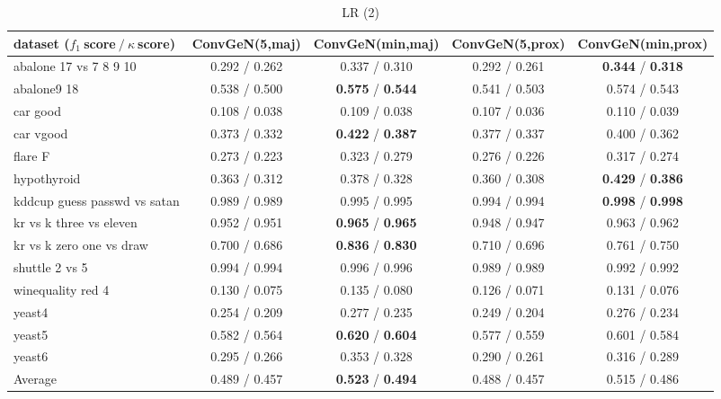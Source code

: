\begin{table*}[ht]\scriptsize\caption{LR (2)}\label{tab:results:LR:B}\centering\tabularnewline
\begin{tabular}{l|@{\hskip3pt}c@{\hskip3pt}|@{\hskip3pt}c@{\hskip3pt}|@{\hskip3pt}c@{\hskip3pt}|@{\hskip3pt}c@{\hskip3pt}}\hline
\textbf{dataset ($f_1~$score$~/~\kappa~$score)} & \textbf{ConvGeN(5,maj)} & \textbf{ConvGeN(min,maj)} & \textbf{ConvGeN(5,prox)} & \textbf{ConvGeN(min,prox)}
\tabularnewline
\hline
abalone 17 vs 7 8 9 10 &  0.292  /  0.262  &  0.337  /  0.310  &  0.292  /  0.261  &  \textbf{0.344}  /  \textbf{0.318} 
\tabularnewline
abalone9 18 &  0.538  /  0.500  &  \textbf{0.575}  /  \textbf{0.544}  &  0.541  /  0.503  &  0.574  /  0.543 
\tabularnewline
car good &  0.108  /  0.038  &  0.109  /  0.038  &  0.107  /  0.036  &  0.110  /  0.039 
\tabularnewline
car vgood &  0.373  /  0.332  &  \textbf{0.422}  /  \textbf{0.387}  &  0.377  /  0.337  &  0.400  /  0.362 
\tabularnewline
flare F &  0.273  /  0.223  &  0.323  /  0.279  &  0.276  /  0.226  &  0.317  /  0.274 
\tabularnewline
hypothyroid &  0.363  /  0.312  &  0.378  /  0.328  &  0.360  /  0.308  &  \textbf{0.429}  /  \textbf{0.386} 
\tabularnewline
kddcup guess passwd vs satan &  0.989  /  0.989  &  0.995  /  0.995  &  0.994  /  0.994  &  \textbf{0.998}  /  \textbf{0.998} 
\tabularnewline
kr vs k three vs eleven &  0.952  /  0.951  &  \textbf{0.965}  /  \textbf{0.965}  &  0.948  /  0.947  &  0.963  /  0.962 
\tabularnewline
kr vs k zero one vs draw &  0.700  /  0.686  &  \textbf{0.836}  /  \textbf{0.830}  &  0.710  /  0.696  &  0.761  /  0.750 
\tabularnewline
shuttle 2 vs 5 &  0.994  /  0.994  &  0.996  /  0.996  &  0.989  /  0.989  &  0.992  /  0.992 
\tabularnewline
winequality red 4 &  0.130  /  0.075  &  0.135  /  0.080  &  0.126  /  0.071  &  0.131  /  0.076 
\tabularnewline
yeast4 &  0.254  /  0.209  &  0.277  /  0.235  &  0.249  /  0.204  &  0.276  /  0.234 
\tabularnewline
yeast5 &  0.582  /  0.564  &  \textbf{0.620}  /  \textbf{0.604}  &  0.577  /  0.559  &  0.601  /  0.584 
\tabularnewline
yeast6 &  0.295  /  0.266  &  0.353  /  0.328  &  0.290  /  0.261  &  0.316  /  0.289 
\tabularnewline
\hline Average &  0.489  /  0.457  &  \textbf{0.523}  /  \textbf{0.494}  &  0.488  /  0.457  &  0.515  /  0.486 
\tabularnewline
\hline\end{tabular}\end{table*}



